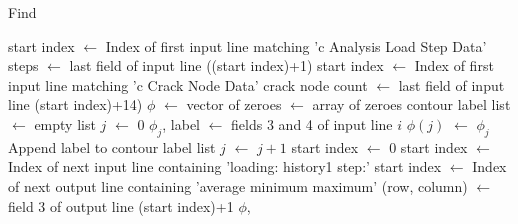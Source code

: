 \begin{algorithm}[tbp]
  \caption{Find \J}
  \label{alg:find_j}
  \begin{algorithmic}
    \State start index $\gets$ Index of first input line matching 'c  Analysis Load Step Data'
    \State steps $\gets$ last field of input line ((start index)+1)
    \State start index $\gets$ Index of first input line matching 'c  Crack Node Data'
    \State crack node count $\gets$ last field of input line (start index)+14)
    \State {}
    \State $\phi$ $\gets$ vector of zeroes 
    \State \J $\gets$ array of zeroes 
    \State \J contour label list $\gets$ empty list
    \State $j$ $\gets$ 0
      \State $\phi_j$, label $\gets$ fields 3 and 4 of input line $i$
      \State $\phi(j)$ $\gets$ $\phi_j$ 
      \State Append label to \J contour label list
      \State $j$ $\gets$ $j+1$
    \EndFor
    \State start index $\gets$ 0
      \State start index $\gets$ Index of next input line containing 'loading: history1     step:'
        \State start index $\gets$ Index of next output line containing 'average      minimum      maximum'
        \State \J(row, column) $\gets$ field 3 of output line (start index)+1
      \EndFor
    \EndFor
    \Return $\phi$, \J
    \EndProcedure
  \end{algorithmic}
\end{algorithm}

